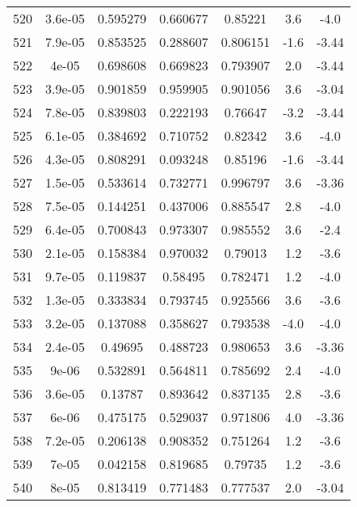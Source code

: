 \begin{table}
\begin{tabular}{c|c|c|c|c|c|c}
520 & 3.6e-05 & 0.595279 & 0.660677 & 0.85221 & 3.6 & -4.0\\
521 & 7.9e-05 & 0.853525 & 0.288607 & 0.806151 & -1.6 & -3.44\\
522 & 4e-05 & 0.698608 & 0.669823 & 0.793907 & 2.0 & -3.44\\
523 & 3.9e-05 & 0.901859 & 0.959905 & 0.901056 & 3.6 & -3.04\\
524 & 7.8e-05 & 0.839803 & 0.222193 & 0.76647 & -3.2 & -3.44\\
525 & 6.1e-05 & 0.384692 & 0.710752 & 0.82342 & 3.6 & -4.0\\
526 & 4.3e-05 & 0.808291 & 0.093248 & 0.85196 & -1.6 & -3.44\\
527 & 1.5e-05 & 0.533614 & 0.732771 & 0.996797 & 3.6 & -3.36\\
528 & 7.5e-05 & 0.144251 & 0.437006 & 0.885547 & 2.8 & -4.0\\
529 & 6.4e-05 & 0.700843 & 0.973307 & 0.985552 & 3.6 & -2.4\\
530 & 2.1e-05 & 0.158384 & 0.970032 & 0.79013 & 1.2 & -3.6\\
531 & 9.7e-05 & 0.119837 & 0.58495 & 0.782471 & 1.2 & -4.0\\
532 & 1.3e-05 & 0.333834 & 0.793745 & 0.925566 & 3.6 & -3.6\\
533 & 3.2e-05 & 0.137088 & 0.358627 & 0.793538 & -4.0 & -4.0\\
534 & 2.4e-05 & 0.49695 & 0.488723 & 0.980653 & 3.6 & -3.36\\
535 & 9e-06 & 0.532891 & 0.564811 & 0.785692 & 2.4 & -4.0\\
536 & 3.6e-05 & 0.13787 & 0.893642 & 0.837135 & 2.8 & -3.6\\
537 & 6e-06 & 0.475175 & 0.529037 & 0.971806 & 4.0 & -3.36\\
538 & 7.2e-05 & 0.206138 & 0.908352 & 0.751264 & 1.2 & -3.6\\
539 & 7e-05 & 0.042158 & 0.819685 & 0.79735 & 1.2 & -3.6\\
540 & 8e-05 & 0.813419 & 0.771483 & 0.777537 & 2.0 & -3.04\\
\end{tabular}
\end{table}
\newpage
